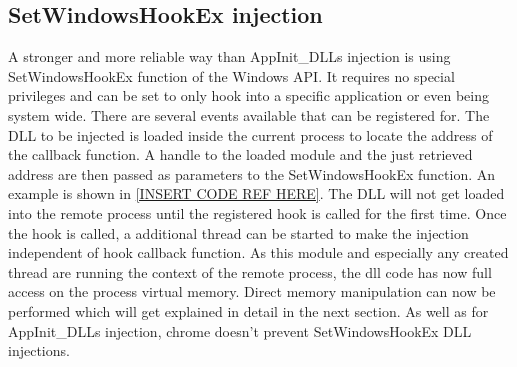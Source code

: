 \subsection{SetWindowsHookEx injection}
A stronger and more reliable way than AppInit\_DLLs injection is using SetWindowsHookEx function of the Windows API. It requires no special privileges and can be set to only hook into a specific application or even being system wide. There are several events available that can be registered for. The DLL to be injected is loaded inside the current process to locate the address of the callback function. A handle to the loaded module and the just retrieved address are then passed as parameters to the SetWindowsHookEx function. An example is shown in \ref{INSERT CODE REF HERE}. The DLL will not get loaded into the remote process until the registered hook is called for the first time. Once the hook is called, a additional thread can be started to make the injection independent of hook callback function. As this module and especially any created thread are running the context of the remote process, the dll code has now full access on the process virtual memory. Direct memory manipulation can now be performed which will get explained in detail in the next section. As well as for AppInit\_DLLs injection, chrome doesn't prevent SetWindowsHookEx DLL injections.